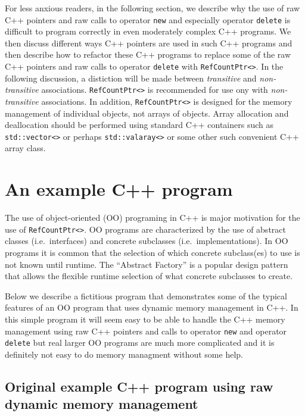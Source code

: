 \documentclass[pdf,ps2pdf,11pt]{SANDreport}
\begin{document}
For less anxious readers, in the following section, we describe why
the use of raw C++ pointers and raw calls to operator {}\texttt{new}
and especially operator {}\texttt{delete} is difficult to program
correctly in even moderately complex C++ programs.  We then discuss
different ways C++ pointers are used in such C++ programs and then
describe how to refactor these C++ programs to replace some of the raw
C++ pointers and raw calls to operator {}\texttt{delete} with
{}\texttt{Ref\-Count\-Ptr<>}.  In the following discussion, a
distiction will be made between {}\textit{transitive} and
{}\textit{non-transitive} associations.  {}\texttt{Ref\-Count\-Ptr<>}
is recommended for use ony with {}\textit{non-transitive}
associations.  In addition, {}\texttt{Ref\-Count\-Ptr<>} is designed
for the memory management of individual objects, not arrays of
objects.  Array allocation and deallocation should be performed using
standard C++ containers such as {}\texttt{std\-::vector<>} or perhaps
{}\texttt{std\-::valaray<>} or some other such convenient C++ array
class.

%
\section{An example C++ program}
%

The use of object-oriented (OO) programing in C++ is major motivation
for the use of {}\texttt{Ref\-Count\-Ptr<>}.  OO programs are
characterized by the use of abstract classes (i.e.~interfaces) and
concrete subclasses (i.e.~implementations).  In OO programs it is
common that the selection of which concrete subclass(es) to use is not
known until runtime.  The ``Abstract Factory'' is a popular design
pattern that allows the flexible runtime selection of what concrete
subclasses to create.

Below we describe a fictitious program that demonstrates some of the
typical features of an OO program that uses dynamic memory management
in C++.  In this simple program it will seem easy to be able to handle
the C++ memory management using raw C++ pointers and calls to operator
{}\texttt{new} and operator {}\texttt{delete} but real larger OO
programs are much more complicated and it is definitely not easy to do
memory managment without some help.

%
\subsection{Original example C++ program using raw dynamic memory management}
%
\end{document}
